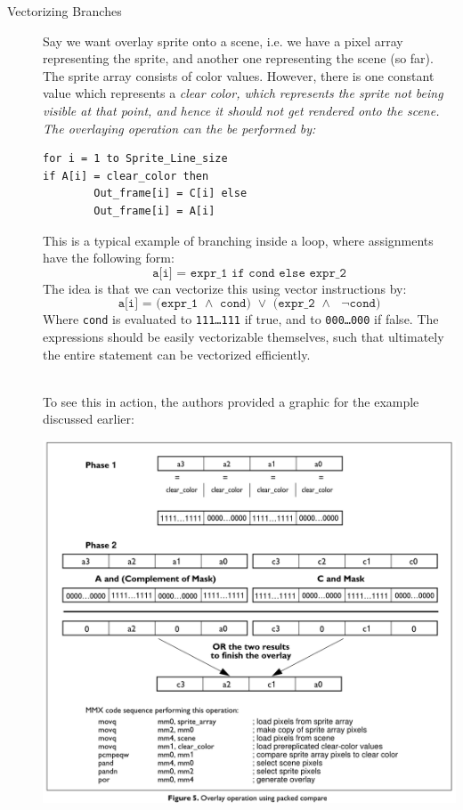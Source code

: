 \documentclass[../../main.tex]{subfiles}
\begin{document}
\begin{description}
    \item[Vectorizing Branches] Say we want overlay sprite onto a scene, i.e. we have a pixel array representing the sprite, and another one representing the scene (so far). The sprite array consists of color values. However, there is one constant value which represents a \em clear color\em , which represents the sprite not being visible at that point, and hence it should not get rendered onto the scene. The overlaying operation can the be performed by:
    \begin{lstlisting}
for i = 1 to Sprite_Line_size
if A[i] = clear_color then
        Out_frame[i] = C[i] else
        Out_frame[i] = A[i]
    \end{lstlisting}

    This is a typical example of branching inside a loop, where assignments have the following form:
    \[
        \texttt{a[i] = expr\_1 if cond else expr\_2}
    \]
    The idea is that we can vectorize this using vector instructions by:
    \[
        \texttt{a[i] = (expr\_1 $\land$ cond) $\lor$ (expr\_2 $\land$ $\lnot$cond)}
    \]
    Where \texttt{cond} is evaluated to \texttt{111\dots111} if true, and to \texttt{000\dots000} if false. The expressions should be easily vectorizable themselves, such that ultimately the entire statement can be vectorized efficiently.

    ~\\
    To see this in action, the authors provided a graphic for the example discussed earlier:

    \includegraphics[width=\textwidth]{chapters/07/vectorizing_branches.png}


\end{description}
\end{document}
